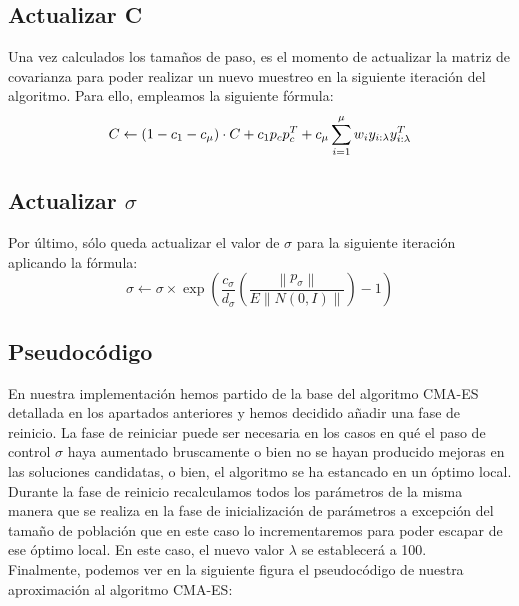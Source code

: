 \subsection{Actualizar C}
Una vez calculados los tamaños de paso, es el momento de actualizar la matriz de covarianza para poder realizar un nuevo muestreo en la siguiente iteración del algoritmo. Para ello, empleamos la siguiente fórmula:
\begin{equation} \label{eq:5}
    C \leftarrow (1 - c_{1} - c_{\mu})\cdot C + c_{1}p_{c}p_{c}^{T} + c_{\mu} \sum_{i=1}^{\mu} w_{i}y_{i:\lambda}y_{i:\lambda}^{T} \\
\end{equation}

\subsection{Actualizar $ \sigma $}
Por último, sólo queda actualizar el valor de $\sigma$ para la siguiente iteración aplicando la fórmula:  
\begin{equation} \label{eq:6}
     \sigma\leftarrow\sigma \times \exp(\frac{c_{\sigma}}{d_{\sigma}} (\frac{\left \| p_{\sigma}\right\|}{E \left \|N(0, I)\right \|}) - 1)
\end{equation}

\subsection{Pseudocódigo}

En nuestra implementación hemos partido de la base del algoritmo CMA-ES detallada en los apartados anteriores y hemos decidido añadir una fase de reinicio. La fase de reiniciar puede ser necesaria en los casos en qué el paso de control $\sigma$ haya aumentado bruscamente o bien no se hayan producido mejoras en las soluciones candidatas, o bien, el algoritmo se ha estancado en un óptimo local. \\

Durante la fase de reinicio recalculamos todos los parámetros de la misma manera que se realiza en la fase de inicialización de parámetros a excepción del tamaño de población que en este caso lo incrementaremos para poder escapar de ese óptimo local. En este caso, el nuevo valor $\lambda$ se establecerá a 100. \\

Finalmente, podemos ver en la siguiente figura el pseudocódigo de nuestra aproximación al algoritmo CMA-ES:


